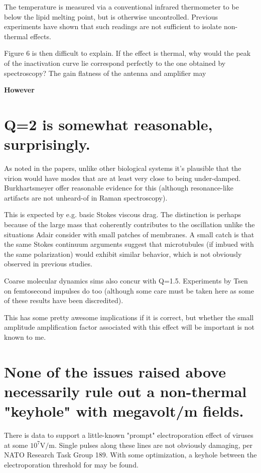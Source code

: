 \documentclass[fleqn,10pt]{paper}
\begin{document}
The temperature is measured via a conventional infrared thermometer to be below the lipid melting point, but is otherwise uncontrolled. Previous experiments have shown that such readings are not sufficient to isolate non-thermal effects. 

Figure 6 is then difficult to explain. If the effect is thermal, why would the peak of the inactivation curve lie correspond perfectly to the one obtained by spectroscopy? The gain flatness of the antenna and amplifier may 



{\Huge \textbf{However}}

\section{Q=2 is somewhat reasonable, surprisingly.}

As noted in the papers, unlike other biological systems it's plausible that the virion would have modes that are at least very close to being under-damped. Burkhartsmeyer offer reasonable evidence for this (although resonance-like artifacts are not unheard-of in Raman spectroscopy). 

This is expected by e.g. basic Stokes viscous drag. The distinction is perhaps because of the large mass that coherently contributes to the oscillation unlike the situations Adair consider with small patches of membranes. A small catch is that the same Stokes continuum arguments suggest that microtubules (if imbued with the same polarization) would exhibit similar behavior, which is not obviously observed in previous studies.

Coarse molecular dynamics sims also concur with Q=1.5. Experiments by Tsen on femtosecond impulses 
do too (although some care must be taken here as some of these results have been discredited).

This has some pretty awesome implications if it is correct, but whether the small amplitude 
amplification factor associated with this effect will be important is not known to me.

\section{None of the issues raised above necessarily rule out a non-thermal "keyhole" with 
megavolt/m fields.}

There is data to support a little-known "prompt" electroporation effect of viruses at 
some $10^7 \text{V/m}$. Single pulses along these lines are not obviously damaging, per NATO 
Research Task Group 189. With some optimization, a keyhole between the electroporation threshold 
for may be found.
\end{document}
